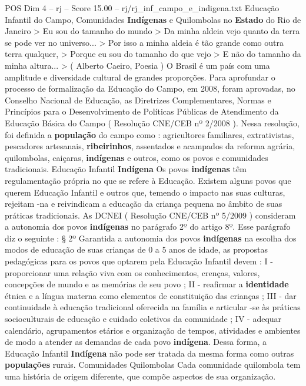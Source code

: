 \begin{textsample}{POS Dim 4 – rj – Score 15.00 – rj/rj\_inf\_campo\_e\_indigena.txt}  \label{ex:f4_pos_161}
Educação Infantil do Campo, Comunidades \textbf{Indígenas} e Quilombolas no \textbf{Estado} do Rio de Janeiro > Eu sou do tamanho do mundo > Da minha aldeia vejo quanto da terra se pode ver no universo... > Por isso a minha aldeia é tão grande como outra terra qualquer, > Porque eu sou do tamanho do que vejo > E não do tamanho da minha altura... > ( Alberto Caeiro, Poesia ) O Brasil é um país com uma amplitude e diversidade cultural de grandes proporções.
Para aprofundar o processo de formalização da Educação do Campo, em 2008, foram aprovadas, no Conselho Nacional de Educação, as Diretrizes Complementares, Normas e Princípios para o Desenvolvimento de Políticas Públicas de Atendimento da Educação Básica do Campo ( Resolução CNE/CEB nº 2/2008 ).
Nessa resolução, foi definida a \textbf{população} do campo como : agricultores familiares, extrativistas, pescadores artesanais, \textbf{ribeirinhos}, assentados e acampados da reforma agrária, quilombolas, caiçaras, \textbf{indígenas} e outros, como os povos e comunidades tradicionais.
Educação Infantil \textbf{Indígena} Os povos \textbf{indígenas} têm regulamentação própria no que se refere à Educação.
Existem alguns povos que querem Educação Infantil e outros que, temendo o impacto nas suas culturas, rejeitam -na e reivindicam a educação da criança pequena no âmbito de suas práticas tradicionais.
As DCNEI ( Resolução CNE/CEB nº 5/2009 ) consideram a autonomia dos povos \textbf{indígenas} no parágrafo 2º do artigo 8º.
Esse parágrafo diz o seguinte : § 2º Garantida a autonomia dos povos \textbf{indígenas} na escolha dos modos de educação de suas crianças de 0 a 5 anos de idade, as propostas pedagógicas para os povos que optarem pela Educação Infantil devem : I - proporcionar uma relação viva com os conhecimentos, crenças, valores, concepções de mundo e as memórias de seu povo ; II - reafirmar a \textbf{identidade} étnica e a língua materna como elementos de constituição das crianças ; III - dar continuidade à educação tradicional oferecida na família e articular -se às práticas socioculturais de educação e cuidado coletivos da comunidade ; IV - adequar calendário, agrupamentos etários e organização de tempos, atividades e ambientes de modo a atender as demandas de cada povo \textbf{indígena}.
Dessa forma, a Educação Infantil \textbf{Indígena} não pode ser tratada da mesma forma como outras \textbf{populações} rurais.
Comunidades Quilombolas Cada comunidade quilombola tem uma história de origem diferente, que compõe aspectos de sua organização.

\end{textsample}
